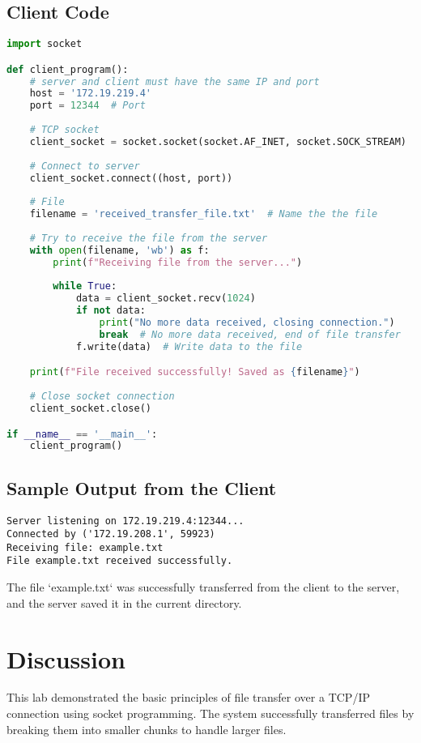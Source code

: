 \documentclass[a4paper,12pt]{article}
\begin{document}
\subsection{Client Code}

\begin{lstlisting}[language=Python, caption=Client Code]
import socket

def client_program():
    # server and client must have the same IP and port
    host = '172.19.219.4'  
    port = 12344  # Port
    
    # TCP socket
    client_socket = socket.socket(socket.AF_INET, socket.SOCK_STREAM)
    
    # Connect to server
    client_socket.connect((host, port))
    
    # File
    filename = 'received_transfer_file.txt'  # Name the the file 
    
    # Try to receive the file from the server
    with open(filename, 'wb') as f:
        print(f"Receiving file from the server...")
        
        while True:
            data = client_socket.recv(1024)
            if not data:
                print("No more data received, closing connection.")
                break  # No more data received, end of file transfer
            f.write(data)  # Write data to the file

    print(f"File received successfully! Saved as {filename}")
    
    # Close socket connection
    client_socket.close()

if __name__ == '__main__':
    client_program()
\end{lstlisting}

\subsection{Sample Output from the Client}

\begin{verbatim}
Server listening on 172.19.219.4:12344...
Connected by ('172.19.208.1', 59923)
Receiving file: example.txt
File example.txt received successfully.
\end{verbatim}

The file `example.txt` was successfully transferred from the client to the server, and the server saved it in the current directory.

\section{Discussion}
This lab demonstrated the basic principles of file transfer over a TCP/IP connection using socket programming. The system successfully transferred files by breaking them into smaller chunks to handle larger files. 
\end{document}
